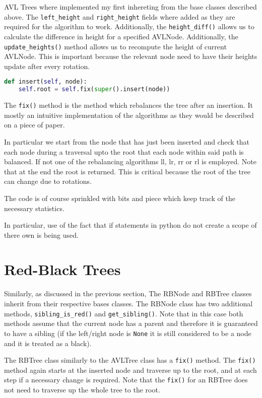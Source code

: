 \documentclass[article]{uom-coursework}
\begin{document}
AVL Trees where implemented my first inhereting
from the base classes described above.
The \texttt{left\_height} and \texttt{right\_height}
fields where added as they are required for the
algorithm to work. Additionally, the
\texttt{height\_diff()} allows us to calculate
the difference in height for a specified AVLNode.
Additionally, the \texttt{update\_heights()} method
allows us to recompute the height of current AVLNode.
This is important because the relevant
node need to have their heights update after every
rotation.

\begin{lstlisting}[caption={The main insert function for AVL Trees},language=Python]
def insert(self, node):
    self.root = self.fix(super().insert(node))
\end{lstlisting}

The \texttt{fix()} method is the method which
rebalances the tree after an insertion. It mostly
an intuitive implementation of the algorithms
as they would be described on a piece of paper.

In particular we start from the node that has just been inserted
and check that each node during a traversal upto the root that
each node within said path is balanced. If not one of the
rebalancing algorithms ll, lr, rr or rl is employed. Note that
at the end the root is returned. This is critical because the
root of the tree can change due to rotations.

The code is of course sprinkled with bits and piece
which keep track of the necessary statistics.

In particular, use of the fact that if statements
in python do not create a scope of there own is being
used.

\section{Red-Black Trees}

Similarly, as discussed in the previous section,
The RBNode and RBTree classes inherit from
their respective bases classes. The RBNode
class has two additional methods,
\texttt{sibling\_is\_red()} and \texttt{get\_sibling()}.
Note that in this case both methods assume that the current
node has a parent and therefore it is guaranteed to have
a sibling (if the left/right node is \texttt{None} it is
still considered to be a node and it is treated as a black).

The RBTree class similarly to the AVLTree class has a
\texttt{fix()} method. The \texttt{fix()} method again starts at
the inserted node and traverse up to the root, and at each step
if a necessary change is required. Note that the \texttt{fix()}
for an RBTree does not need to traverse up the whole tree to the
root.
\end{document}
